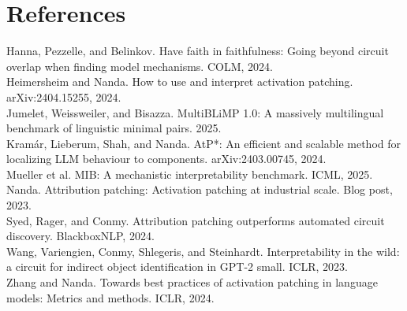 \documentclass[10pt,a4paper]{article}
\begin{document}
\section*{References}
{\small
\setlength{\parskip}{0.15em}
Hanna, Pezzelle, and Belinkov. Have faith in faithfulness: Going beyond circuit overlap when finding model mechanisms. COLM, 2024.\\
Heimersheim and Nanda. How to use and interpret activation patching. arXiv:2404.15255, 2024.\\
Jumelet, Weissweiler, and Bisazza. MultiBLiMP 1.0: A massively multilingual benchmark of linguistic minimal pairs. 2025.\\
Kram\'ar, Lieberum, Shah, and Nanda. AtP*: An efficient and scalable method for localizing LLM behaviour to components. arXiv:2403.00745, 2024.\\
Mueller et al. MIB: A mechanistic interpretability benchmark. ICML, 2025.\\
Nanda. Attribution patching: Activation patching at industrial scale. Blog post, 2023.\\
Syed, Rager, and Conmy. Attribution patching outperforms automated circuit discovery. BlackboxNLP, 2024.\\
Wang, Variengien, Conmy, Shlegeris, and Steinhardt. Interpretability in the wild: a circuit for indirect object identification in GPT-2 small. ICLR, 2023.\\
Zhang and Nanda. Towards best practices of activation patching in language models: Metrics and methods. ICLR, 2024.
}
\end{document}
